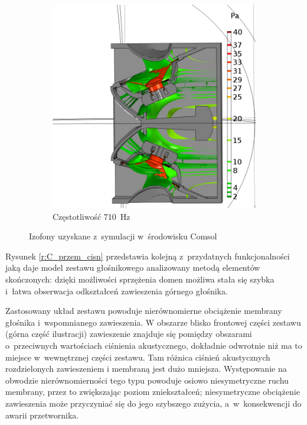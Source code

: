\documentclass[12pt]{oska}
\begin{document}
\begin{figure}[!ht]
\begin{subfigure}[b]{.49\textwidth}
			\includegraphics[width=\textwidth]{absp_710Hz.png}
			\caption{Częstotliwość \SI{710}{\hertz}}
			\label{r:C_710iz}
		\end{subfigure}
		
		\caption{Izofony uzyskane z~symulacji w~środowisku Comsol}
		\label{r:C_balony}
	\end{figure}
	
	Rysunek \ref{r:C_przem_cisn} przedstawia kolejną z~przydatnych funkcjonalności jaką daje model zestawu głośnikowego analizowany metodą elementów skończonych: dzięki możliwości sprzężenia domen możliwa stała się szybka i~łatwa obserwacja odkształceń zawieszenia górnego głośnika. 
	
	Zastosowany układ zestawu powoduje nierównomierne obciążenie membrany głośnika i~wspomnianego zawieszenia. W obszarze blisko frontowej części zestawu (górna część ilustracji) zawieszenie znajduje się pomiędzy obszarami o~przeciwnych wartościach ciśnienia akustycznego, dokładnie odwrotnie niż ma to miejsce w~wewnętrznej części zestawu. Tam różnica ciśnień akustycznych rozdzielonych zawieszeniem i membraną jest dużo mniejsza. Występowanie na obwodzie nierównomierności tego typu powoduje osiowo niesymetryczne ruchu membrany, przez to zwiększając poziom zniekształceń; niesymetryczne obciążenie zawieszenia może przyczyniać się do jego szybszego zużycia, a~w~konsekwencji do awarii przetwornika.  
	
\end{document}
